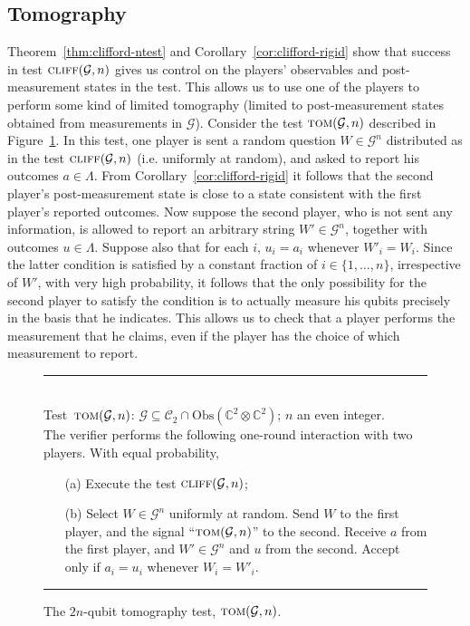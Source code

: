 \documentclass[11pt]{article}
\theoremstyle{remark}
\theoremstyle{definition}
\newcommand{\C}{\ensuremath{\mathbb{C}}}
\newcommand{\setft}[1]{\mathrm{#1}}
\newcommand{\Obs}{\setft{Obs}}
\newcommand{\pbt}{\textsc{pbt}}
\newcommand{\cliff}{\textsc{cliff}}
\newcommand{\tom}{\textsc{tom}}
\newcommand{\cliffordgb}{{\mathcal{C}_2}}
\begin{document}
\subsection{Tomography}

Theorem~\ref{thm:clifford-ntest} and Corollary~\ref{cor:clifford-rigid} show that success in test $\cliff(\mathcal{G},n)$ gives us control on the players' observables and post-measurement states in the test. This allows us to use one of the players to perform some kind of limited tomography (limited to post-measurement states obtained from measurements in $\mathcal{G}$). Consider the test $\tom(\mathcal{G},n)$ described in Figure~\ref{fig:tomography-test}. In this test, one player is sent a random question $W\in\mathcal{G}^n$ distributed as in the test $\cliff(\mathcal{G},n)$ (i.e. uniformly at random), and asked to report his outcomes $a\in\Lambda$. From  Corollary~\ref{cor:clifford-rigid} it follows that the second player's post-measurement state is close to a state consistent with the first player's reported outcomes. Now suppose the second player, who is not sent any information, is allowed to report an arbitrary string $W'\in \mathcal{G}^n$, together with outcomes $u\in\Lambda$. Suppose also that for each $i$, $u_i=a_i$ whenever $W'_i=W_i$. Since the latter condition is satisfied by a constant fraction of $i\in\{1,\ldots,n\}$, irrespective of $W'$, with very high probability, it follows that the only possibility for the second player to satisfy the condition is to actually measure his qubits precisely in the basis that he indicates. This allows us to check that a player performs the measurement that he claims, even if the player has the choice of which measurement to report. 

\begin{figure}[H]
\rule[1ex]{16.5cm}{0.5pt}\\
Test~$\tom(\mathcal{G},n)$: $\mathcal{G} \subseteq \cliffordgb \cap \Obs(\C^2\otimes \C^2)$; $n$ an even integer.  \\
The verifier performs the following one-round interaction with two
players.  With equal probability,
\begin{enumerate}
\item[(a)] Execute the test $\cliff(\mathcal{G},n)$; 
\item[(b)] Select $W\in\mathcal{G}^n$ uniformly at random. Send $W$ to the first player, and the signal ``$\tom(\mathcal{G},n)$'' to the second. Receive $a$ from the first player, and $W'\in\mathcal{G}^n$ and $u$ from the second. Accept only if $a_i=u_i$ whenever $W_i=W'_i$. 
\end{enumerate}
\rule[2ex]{16.5cm}{0.5pt}\vspace{-1cm}
\caption{The $2n$-qubit tomography test, $\tom(\mathcal{G},n)$.}
\label{fig:tomography-test}
\end{figure} 
\end{document}
